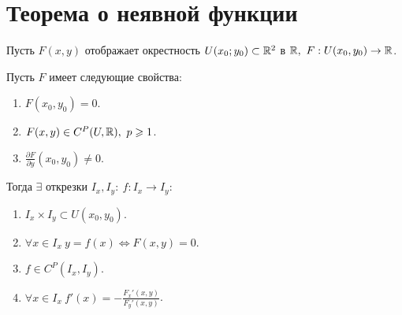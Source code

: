 

\section{Теорема о неявной функции}

\begin{theorem}\label{theorem:1}
    Пусть $ F(x,y) $ отображает окрестность $ U(x_0;y_0) \subset \mathbb{R}^2 $ в $ \R, \ F:U(x_0,y_0)\rightarrow\R $.

    Пусть $ F $ имеет следующие свойства:
    \begin{enumerate}
        \item $ F(x_0,y_0) = 0 $.
        \item $ F(x,y) \in C^P(U,\mathbb{R}), \ p \geqslant 1 $.
        \item $ \frac{\partial F}{\partial y}(x_0,y_0)\ne 0 $.
    \end{enumerate}

    Тогда $ \exists $ открезки $ I_x,I_y: \ f:I_x \rightarrow I_y $:
    \begin{enumerate}
        \item $ I_x \times I_y \subset U(x_0,y_0) $.
        \item $ \forall x \in I_x \ y = f(x) \iff F(x,y) = 0 $.
        \item $ f \in C^P(I_x,I_y) $.
        \item $ \forall x \in I_x \ f'(x) = -\frac{F_x'(x,y)}{F_y'(x,y)} $.
    \end{enumerate}
\end{theorem}

